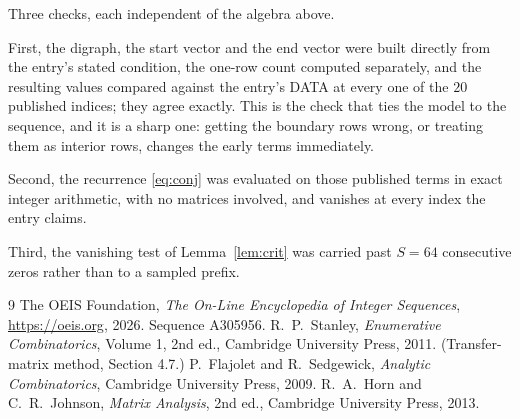 \documentclass[11pt,a4paper]{article}
\theoremstyle{plain}
\theoremstyle{definition}
\begin{document}
Three checks, each independent of the algebra above.

First, the digraph, the start vector and the end vector were built directly from the
entry's stated condition, the one-row count computed separately, and the resulting values
compared against the entry's DATA at every one of the $20$ published indices; they
agree exactly. This is the check that ties the model to the sequence, and it is a sharp one:
getting the boundary rows wrong, or treating them as interior rows, changes the early terms
immediately.

Second, the recurrence \eqref{eq:conj} was evaluated on those published terms in exact
integer arithmetic, with no matrices involved, and vanishes at every index the entry claims.

Third, the vanishing test of Lemma~\ref{lem:crit} was carried past $S=64$ consecutive
zeros rather than to a sampled prefix.

\begin{thebibliography}{9}
 The OEIS Foundation, \emph{The On-Line Encyclopedia of Integer
Sequences}, \url{https://oeis.org}, 2026. Sequence A305956.
 R.~P.~Stanley, \emph{Enumerative Combinatorics}, Volume 1, 2nd ed.,
Cambridge University Press, 2011. (Transfer-matrix method, Section 4.7.)
 P.~Flajolet and R.~Sedgewick, \emph{Analytic Combinatorics}, Cambridge
University Press, 2009.
 R.~A.~Horn and C.~R.~Johnson, \emph{Matrix Analysis}, 2nd ed., Cambridge
University Press, 2013.
\end{thebibliography}
\end{document}
